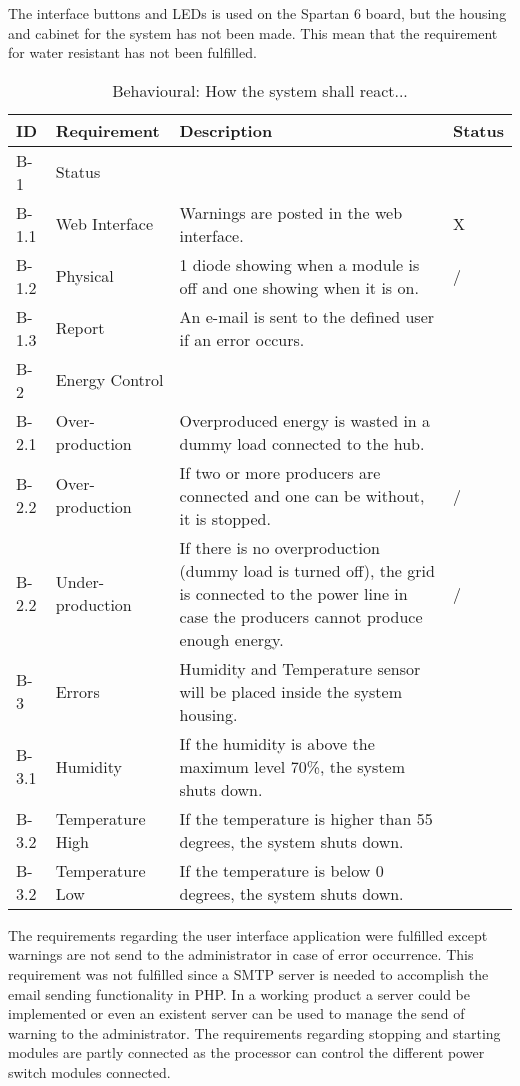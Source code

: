 The interface buttons and LEDs is used on the Spartan 6 board, but the housing and cabinet for the system has not been made. This mean that the requirement for water resistant has not been fulfilled.\\
\begin{table}[H]
	\begin{tabular} [b] {| p{1.1cm} |  p{2.5cm} | p{11.0cm} | p{1.0cm} |}
	\hline
	\textbf{ID} & \textbf{Requirement} & \textbf{Description} & Status\\\hline
		B-1 	&  Status 			& ~ & ~ \\ \hline
		B-1.1 & Web Interface	& Warnings are posted in the web interface. & X \\\hline
		B-1.2 & Physical		& 1 diode showing when a module is off and one showing when it is on. & / \\ \hline
		B-1.3 & Report			& An e-mail is sent to the defined user if an error occurs. & ~ \\\hline
		B-2 & Energy Control	& ~ & ~ \\\hline
		B-2.1 & Over-production	& Overproduced energy is wasted in a dummy load connected to the hub. & ~ \\\hline
		B-2.2 & Over-production	& If two or more producers are connected and one can be without, it is stopped. & / \\\hline
		B-2.2 & Under-production	& If there is no overproduction (dummy load is turned off), the grid is connected to the power line in case the producers cannot produce enough energy. & / \\\hline
		B-3 & Errors	 		& Humidity and Temperature sensor will be placed inside the system housing. & ~ \\\hline
		B-3.1 & Humidity		& If the humidity is above the maximum level 70\%, the system shuts down. & ~ \\\hline
		B-3.2 & Temperature High& If the temperature is higher than 55 degrees,  the system shuts down. & ~ \\\hline
		B-3.2 & Temperature Low & If the temperature is below 0 degrees, the system shuts down. & ~ \\\hline
	\end{tabular}
	\caption{Behavioural: How the system shall react...}
\end{table}
The requirements regarding the user interface application were fulfilled except warnings are not send to the administrator in case of error occurrence. This requirement was not fulfilled since a SMTP server is needed to accomplish the email sending functionality in PHP. In a working product a server could be implemented or even an existent server can be used to manage the send of warning to the administrator.
\p The requirements regarding stopping and starting modules are partly connected as the processor can control the different power switch modules connected. 


